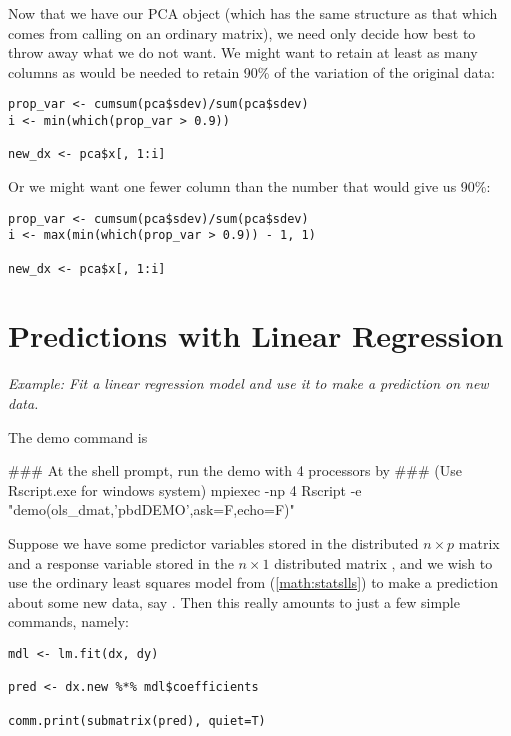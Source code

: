 Now that we have our PCA object (which has the same structure as that which comes from calling  on an ordinary  matrix), we need only decide how best to throw away what we do not want.  We might want to retain at least as many columns as would be needed to retain 90\% of the variation of the original data:

\begin{lstlisting}[language=rr]
prop_var <- cumsum(pca$sdev)/sum(pca$sdev)
i <- min(which(prop_var > 0.9))

new_dx <- pca$x[, 1:i]
\end{lstlisting}

Or we might want one fewer column than the number that would give us 90\%:

\begin{lstlisting}[language=rr]
prop_var <- cumsum(pca$sdev)/sum(pca$sdev)
i <- max(min(which(prop_var > 0.9)) - 1, 1)

new_dx <- pca$x[, 1:i]
\end{lstlisting}








\section{Predictions with Linear Regression}

\emph{Example:  Fit a linear regression model and use it to make a prediction on new data.}

The demo command is
\begin{Command}
### At the shell prompt, run the demo with 4 processors by
### (Use Rscript.exe for windows system)
mpiexec -np 4 Rscript -e "demo(ols_dmat,'pbdDEMO',ask=F,echo=F)"
\end{Command}

Suppose we have some predictor variables stored in the distributed $n\times p$ matrix  and a response variable stored in the $n\times 1$ distributed matrix , and we wish to use the ordinary least squares model from (\ref{math:statslls}) to make a prediction about some new data, say .  Then this really amounts to just a few simple commands, namely:
\begin{lstlisting}[language=rr]
mdl <- lm.fit(dx, dy)

pred <- dx.new %*% mdl$coefficients

comm.print(submatrix(pred), quiet=T)
\end{lstlisting}


